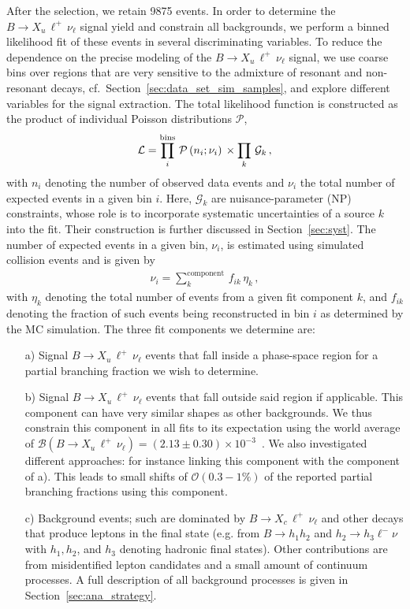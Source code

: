 \documentclass[twocolumn,aps,prd,superscriptaddress,nofootinbib,floatfix,preprintnumbers,a4]{revtex4-1}
\newcommand{\bulnu}{\ensuremath{B \to X_u \, \ell^+\, \nu_{\ell}}\xspace}
\newcommand{\bclnu}{\ensuremath{B \to X_c \, \ell^+\, \nu_{\ell}}\xspace}
\begin{document}
After the selection, we retain 9875 events. In order to determine the \bulnu signal yield and constrain all backgrounds, we perform a binned likelihood fit of these events in several discriminating variables. To reduce the dependence on the precise modeling of the \bulnu signal, we use coarse bins over regions that are very sensitive to the admixture of resonant and non-resonant decays, cf.~Section~\ref{sec:data_set_sim_samples}, and explore different variables for the signal extraction. The total likelihood function is constructed as the product of individual Poisson distributions $\mathcal{P}$,
\begin{align}\label{eq:likelihood}
 \mathcal{L} =  \prod_i^{\rm bins} \, \mathcal{P}\left( n_i ; \nu_i \right)  \,  \times \prod_k \, \mathcal{G}_k \, ,
\end{align}
with $n_i$ denoting the number of observed data events and $\nu_i$ the total number of expected events in a given bin $i$. Here, $\mathcal{G}_k$ are nuisance-parameter (NP) constraints, whose role is to incorporate systematic uncertainties of a source $k$ into the fit. Their construction is further discussed in Section~\ref{sec:syst}. The number of expected events in a given bin, $\nu_i$, is estimated using simulated collision events and is given by
\begin{align} \label{eq:nui}
 \nu_i = \sum_k^{\mathrm{component}} \, f_{ik} \, \eta_k \, ,
\end{align}
with $\eta_k$ denoting the total number of events from a given fit component $k$, and $f_{ik}$ denoting the fraction of such events being reconstructed in bin $i$ as determined by the MC simulation. The three fit components we determine are:
\begin{itemize}
 \item[a)] Signal \bulnu events that fall inside a phase-space region for a partial branching fraction we wish to determine.
 \item[b)] Signal \bulnu events that fall outside said region if applicable. This component can have very similar shapes as other backgrounds. We thus constrain this component in all fits to its expectation using the world average of $\mathcal{B}(\bulnu) = \left(  2.13 \pm 0.30 \right) \times 10^{-3}$~\cite{pdg:2020}. We also investigated different approaches: for instance linking this component with the component of a). This leads to small shifts of $\mathcal{O}(0.3 - 1\%)$ of the reported partial branching fractions using this component.
 \item[c)] Background events; such are dominated by \bclnu and other decays that produce leptons in the final state (e.g. from $B \to h_1 h_2$ and $h_2 \to h_3 \ell^- \nu$  with $h_1, h_2$, and $h_3$ denoting hadronic final states). Other contributions are from misidentified lepton candidates and a small amount of continuum processes. A full description of all background processes is given in Section~\ref{sec:ana_strategy}. 
 \end{itemize}
\end{document}
